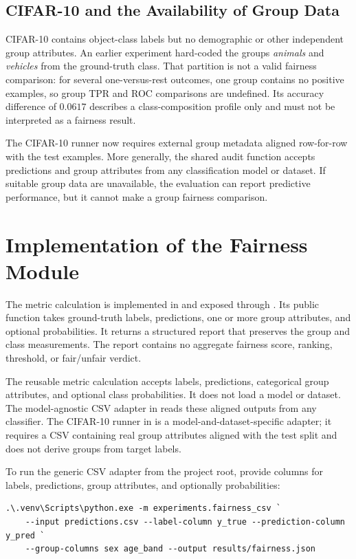 \documentclass[12pt,a4paper]{article}
\begin{document}
\subsection{CIFAR-10 and the Availability of Group Data}

CIFAR-10 contains object-class labels but no demographic or other independent group attributes. An earlier experiment hard-coded the groups \emph{animals} and \emph{vehicles} from the ground-truth class. That partition is not a valid fairness comparison: for several one-versus-rest outcomes, one group contains no positive examples, so group TPR and ROC comparisons are undefined. Its accuracy difference of $0.0617$ describes a class-composition profile only and must not be interpreted as a fairness result.

The CIFAR-10 runner now requires external group metadata aligned row-for-row with the test examples. More generally, the shared audit function accepts predictions and group attributes from any classification model or dataset. If suitable group data are unavailable, the evaluation can report predictive performance, but it cannot make a group fairness comparison.

\section{Implementation of the Fairness Module}

The metric calculation is implemented in  and exposed through . Its public function takes ground-truth labels, predictions, one or more group attributes, and optional probabilities. It returns a structured report that preserves the group and class measurements. The report contains no aggregate fairness score, ranking, threshold, or fair/unfair verdict.

The reusable metric calculation accepts labels, predictions, categorical group attributes, and optional class probabilities. It does not load a model or dataset. The model-agnostic CSV adapter in  reads these aligned outputs from any classifier. The CIFAR-10 runner in  is a model-and-dataset-specific adapter; it requires a CSV containing real group attributes aligned with the test split and does not derive groups from target labels.

To run the generic CSV adapter from the project root, provide columns for labels, predictions, group attributes, and optionally probabilities:
\begin{verbatim}
.\.venv\Scripts\python.exe -m experiments.fairness_csv `
    --input predictions.csv --label-column y_true --prediction-column y_pred `
    --group-columns sex age_band --output results/fairness.json
\end{verbatim}
\end{document}
